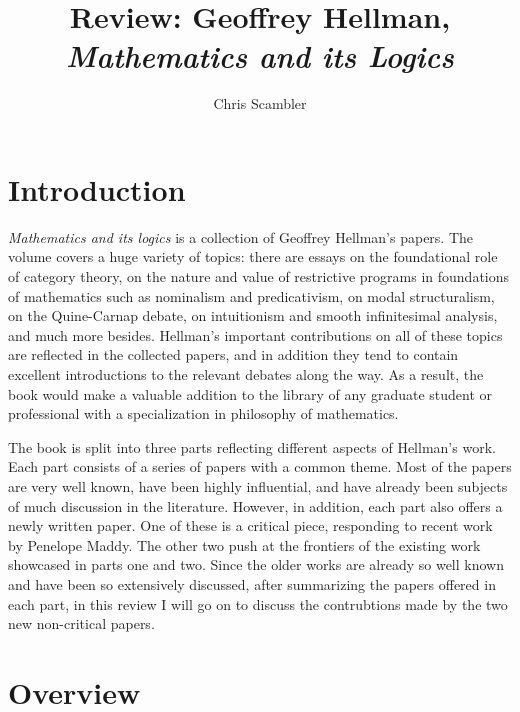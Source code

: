 \documentclass{asl}
\title{Review: Geoffrey Hellman, \emph{Mathematics and its Logics}}
\author{Chris Scambler}
\theoremstyle{definition}
\begin{document}
 
\maketitle

\section{Introduction}

\emph{Mathematics and its logics} is a collection of Geoffrey Hellman's papers. 
The volume covers a huge variety of topics:
there are essays on the foundational role of category theory, 
on the nature and value of restrictive programs in foundations of mathematics such as nominalism and predicativism, 
on modal structuralism, on the Quine-Carnap debate, 
on intuitionism and smooth infinitesimal analysis, 
and much more besides. 
Hellman's important contributions on all of these topics are reflected in the collected papers, 
and in addition they tend to contain excellent introductions to the relevant debates along the way.
As a result, 
the book would make a valuable addition to the library of any graduate student or professional with a specialization in philosophy of mathematics. 

The book is split into three parts reflecting different aspects of Hellman's work. 
Each part consists of a series of papers with a common theme.
Most of the papers are very well known, have been highly influential, 
and have already been subjects of much discussion in the literature.
However, in addition, 
each part also offers a newly written paper.
One of these is a critical piece, responding to recent work by Penelope Maddy. 
The other two push at the frontiers of the existing work showcased in parts one and two.
Since the older works are already so well known and have been so extensively discussed, 
after summarizing the papers offered in each part, 
in this review I will go on to discuss the contrubtions made by the two new non-critical papers.

\section{Overview}
\end{document}
